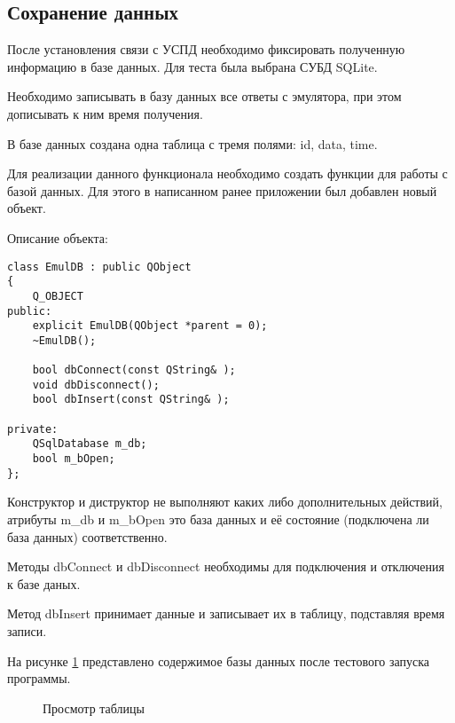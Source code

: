 \subsection{Сохранение данных}

После установления связи с УСПД необходимо фиксировать полученную информацию в базе данных. Для теста была выбрана СУБД SQLite. 

Необходимо записывать в базу данных все ответы с эмулятора, при этом дописывать к ним время получения.

В базе данных создана одна таблица с тремя полями: id, data, time.

Для реализации данного функционала необходимо создать функции для работы с базой данных. Для этого в написанном ранее приложении был добавлен новый объект. 

Описание объекта:

\begin{lstlisting}
class EmulDB : public QObject
{
    Q_OBJECT
public:
    explicit EmulDB(QObject *parent = 0);
    ~EmulDB();

    bool dbConnect(const QString& );
    void dbDisconnect();
    bool dbInsert(const QString& );

private:
    QSqlDatabase m_db;
    bool m_bOpen;
};
\end{lstlisting}

Конструктор и диструктор не выполняют каких либо дополнительных действий, атрибуты m\_db и m\_bOpen это база данных и её состояние (подключена ли база данных) соответственно.

Методы dbConnect и dbDisconnect необходимы для подключения и отключения к базе даных. 

Метод dbInsert принимает данные и записывает их в таблицу, подставляя время записи.

На рисунке \ref{dBase:dBase} представлено содержимое базы данных после тестового запуска программы.

\begin{figure}[h!]
 \caption{Просмотр таблицы}
 \label{dBase:dBase}
\end{figure}